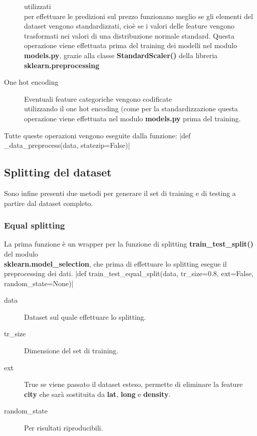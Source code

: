 \documentclass{article}
\begin{document}
\begin{description}
		utilizzati \\per effettuare le predizioni sul prezzo funzionano meglio
		se gli elementi del dataset vengono standardizzati, cioè se i valori
		delle feature vengono trasformati nei valori di una distribuzione
		normale standard. Questa operazione viene effettuata prima del training
		dei modelli nel modulo \textbf{models.py}, grazie alla classe
		\textbf{StandardScaler()} della libreria \\
		\textbf{sklearn.preprocessing}
	\item[One hot encoding] Eventuali feature categoriche vengono codificate\\
		utilizzando il one hot encoding (come per la standardizzazione questa
		operazione viene effettuata nel modulo \textbf{models.py} prima del
		training.
\end{description}
Tutte queste operazioni vengono eseguite dalla funzione:
|def _data_preprocess(data, statezip=False)|

\subsection{Splitting del dataset}
Sono infine presenti due metodi per generare il set di training e di testing a
partire dal dataset completo.

\subsubsection{Equal splitting}
\label{sec:eqsplit}
La prima funzione è un wrapper per la funzione di splitting
\textbf{train\_test\_split()} del modulo \\\textbf{sklearn.model\_selection},
che prima di effettuare lo splitting esegue il preprocessing dei dati.
|def train_test_equal_split(data, tr_size=0.8, ext=False, random_state=None)|
\begin{description}
	\item[data] Dataset sul quale effettuare lo splitting.
	\item[tr\_size] Dimensione del set di training.
	\item[ext] True se viene passato il dataset esteso, permette di eliminare
		la feature \textbf{city} che sarà sostituita da \textbf{lat},
		\textbf{long} e \textbf{density}.
	\item[random\_state] Per risultati riproducibili.
\end{description}
\end{document}
